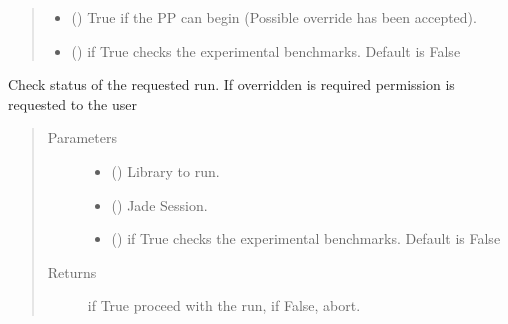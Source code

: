 \documentclass[letterpaper,10pt,english]{sphinxmanual}
\begin{document}
\begin{fulllineitems}
\begin{fulllineitems}
\begin{quote}
\begin{description}
\begin{itemize}
\item {} 
 () \textendash{} True if the PP can begin (Possible override has been accepted).

\item {} 
 () \textendash{} if True checks the experimental benchmarks. Default is False

\end{itemize}


\end{description}\end{quote}

\end{fulllineitems}


\begin{fulllineitems}
\label{\detokenize{api/initobjects:status.Status.check_override_run}}
Check status of the requested run. If overridden is required permission
is requested to the user
\begin{quote}\begin{description}
\item[{Parameters}] \leavevmode\begin{itemize}
\item {} 
 () \textendash{} Library to run.

\item {} 
 ({\hyperref[\detokenize{api/initobjects:main.Session}]{}}) \textendash{} Jade Session.

\item {} 
 () \textendash{} if True checks the experimental benchmarks. Default is False

\end{itemize}

\item[{Returns}] \leavevmode
{} \textendash{} if True proceed with the run, if False, abort.


\end{description}
\end{quote}
\end{fulllineitems}
\end{fulllineitems}
\end{document}
